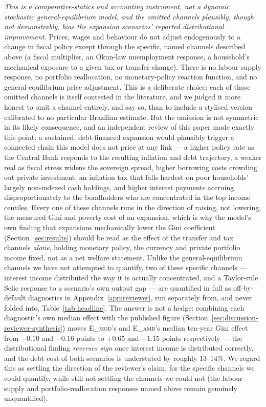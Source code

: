 \documentclass[11pt,a4paper]{article}
\begin{document}
\emph{This is a comparative-statics and accounting instrument, not a dynamic stochastic general-equilibrium model, and the omitted channels plausibly, though not demonstrably, bias the expansion scenarios' reported distributional improvement.} Prices, wages and behaviour do not adjust endogenously to a change in fiscal policy except through the specific, named channels described above (a fiscal multiplier, an Okun-law unemployment response, a household's mechanical exposure to a given tax or transfer change). There is no labour-supply response, no portfolio reallocation, no monetary-policy reaction function, and no general-equilibrium price adjustment. This is a deliberate choice: each of those omitted channels is itself contested in the literature, and we judged it more honest to omit a channel entirely, and say so, than to include a stylised version calibrated to no particular Brazilian estimate. But the omission is not symmetric in its likely consequence, and an independent review of this paper made exactly this point: a sustained, debt-financed expansion would plausibly trigger a connected chain this model does not price at any link --- a higher policy rate as the Central Bank responds to the resulting inflation and debt trajectory, a weaker real as fiscal stress widens the sovereign spread, higher borrowing costs crowding out private investment, an inflation tax that falls hardest on poor households' largely non-indexed cash holdings, and higher interest payments accruing disproportionately to the bondholders who are concentrated in the top income centiles. Every one of these channels runs in the direction of raising, not lowering, the measured Gini and poverty cost of an expansion, which is why the model's own finding that expansions mechanically lower the Gini coefficient (Section~\ref{sec:results}) should be read as the effect of the transfer and tax channels \emph{alone}, holding monetary policy, the currency and private portfolio income fixed, not as a net welfare statement. Unlike the general-equilibrium channels we have not attempted to quantify, two of these specific channels --- interest income distributed the way it is actually concentrated, and a Taylor-rule Selic response to a scenario's own output gap --- are quantified in full as off-by-default diagnostics in Appendix~\ref{app:reviewer}, run separately from, and never folded into, Table~\ref{tab:headline}. The answer is not a hedge: combining each diagnostic's own median effect with the published figure (Section~\ref{sec:discussion-reviewer-synthesis}) moves \textsc{E\_mod}'s and \textsc{E\_amb}'s median ten-year Gini effect from $-0.10$ and $-0.16$ points to $+0.65$ and $+1.15$ points respectively --- the distributional finding \emph{reverses sign} once interest income is distributed correctly, and the debt cost of both scenarios is understated by roughly 13--14\%. We regard this as settling the direction of the reviewer's claim, for the specific channels we could quantify, while still not settling the channels we could not (the labour-supply and portfolio-reallocation responses named above remain genuinely unquantified).
\end{document}
